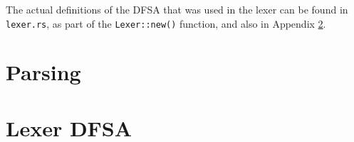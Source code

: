 \documentclass{article}
\newcommand{\code}[1]{\texttt{#1}}
\begin{document}
\begin{figure}[H]
    \centering
\end{figure}

The actual definitions of the DFSA that was used in the lexer can be found in
\code{lexer.rs}, as part of the \code{Lexer::new()} function, and also in
Appendix \ref{sec:lexer-dfsa}.


\newpage

\section{Parsing}

\newpage

\appendix

\section{Lexer DFSA}
\label{sec:lexer-dfsa}
\end{document}
